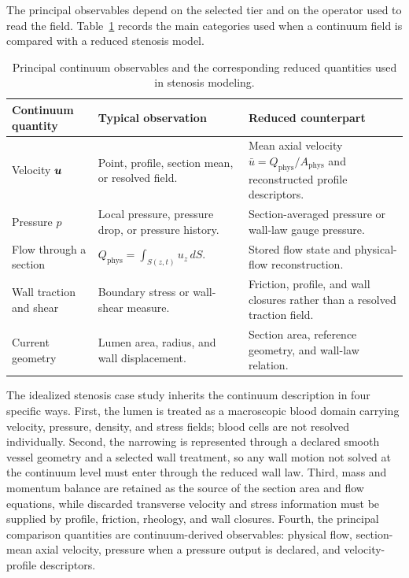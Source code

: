 The principal observables depend on the selected tier and on the operator used
to read the field. Table~\ref{tab:continuum-principal-observables} records the
main categories used when a continuum field is compared with a reduced stenosis
model.

\begin{table}[!htb]
    \centering
    \small
    \caption{Principal continuum observables and the corresponding reduced
    quantities used in stenosis modeling.}
    \label{tab:continuum-principal-observables}
    \begin{tabularx}{\textwidth}{@{}
        >{\raggedright\arraybackslash}p{}
        >{\raggedright\arraybackslash}p{}
        >{\raggedright\arraybackslash}X
        @{}}
        \toprule
        \textbf{Continuum quantity}
            & \textbf{Typical observation}
            & \textbf{Reduced counterpart} \\
        \midrule
        Velocity $\bm{u}$
            & Point, profile, section mean, or resolved field.
            & Mean axial velocity $\bar u=Q_{\mathrm{phys}}/A_{\mathrm{phys}}$
            and reconstructed profile descriptors. \\
        Pressure $p$
            & Local pressure, pressure drop, or pressure history.
            & Section-averaged pressure or wall-law gauge pressure. \\
        Flow through a section
            & $Q_{\mathrm{phys}}=\int_{S(z,t)} u_z\,dS$.
            & Stored flow state and physical-flow reconstruction. \\
        Wall traction and shear
            & Boundary stress or wall-shear measure.
            & Friction, profile, and wall closures rather than a resolved
            traction field. \\
        Current geometry
            & Lumen area, radius, and wall displacement.
            & Section area, reference geometry, and wall-law relation. \\
        \bottomrule
    \end{tabularx}
\end{table}

\begin{stenosisillustration}
The idealized stenosis case study inherits the continuum description in four
specific ways. First, the lumen is treated as a macroscopic blood domain
carrying velocity, pressure, density, and stress fields; blood cells are not
resolved individually. Second, the narrowing is represented through a declared
smooth vessel geometry and a selected wall treatment, so any wall motion not
solved at the continuum level must enter through the reduced wall law. Third,
mass and momentum balance are retained as the source of the section area and
flow equations, while discarded transverse velocity and stress information must
be supplied by profile, friction, rheology, and wall closures. Fourth, the
principal comparison quantities are continuum-derived observables: physical
flow, section-mean axial velocity, pressure when a pressure output is declared,
and velocity-profile descriptors.
\end{stenosisillustration}

